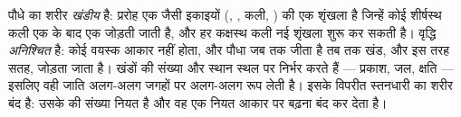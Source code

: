 \begin{proposition}[एक खंडीय, विवृत शरीर]\label{prop:b1:flowering-plant-organization:modular}
पौधे का शरीर \emph{खंडीय} है: प्ररोह एक जैसी
इकाइयों (, , कली, ) की एक शृंखला है जिन्हें
कोई शीर्षस्थ कली एक के बाद एक जोड़ती जाती है, और हर कक्षस्थ कली नई
शृंखला शुरू कर सकती है। वृद्धि \emph{अनिश्चित}
है: कोई वयस्क आकार नहीं होता, और पौधा जब तक जीता है तब तक खंड, और इस
तरह सतह, जोड़ता जाता है। खंडों की संख्या और स्थान स्थल पर निर्भर करते
हैं --- प्रकाश, जल, क्षति --- इसलिए वही जाति अलग-अलग जगहों पर अलग-अलग
रूप लेती है। इसके विपरीत स्तनधारी का शरीर बंद है: उसके  की संख्या
नियत है और वह एक नियत आकार पर बढ़ना बंद कर देता है।
\end{proposition}


